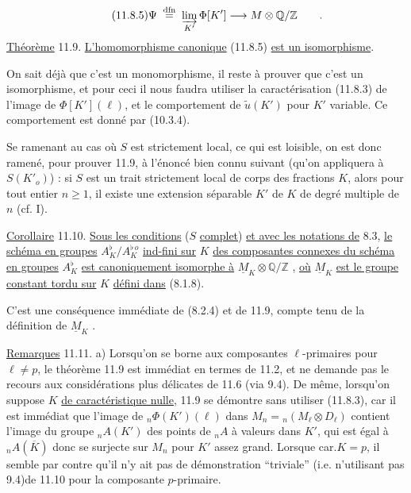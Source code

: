\begin{equation}\tag{11.8.5}
\Psi \;\overset{\mathrm{dfn}}{=}\; \varinjlim_{K'} \Phi[K'] \longrightarrow M \otimes \mathbb{Q}/\mathbb{Z} \qquad .
\end{equation}
\underline{Théorème} 11.9. \underline{L'homomorphisme canonique} (11.8.5) \underline{est un isomorphisme}.

On sait déjà que c'est un monomorphisme, il reste à prouver que c'est un isomorphisme, et pour ceci il nous faudra utiliser la caractérisation (11.8.3) de l'image de $\Phi[K'](\ell)$, et le comportement de $\widetilde{u}(K')$ pour $K'$ variable. Ce comportement est donné par (10.3.4).



Se ramenant au cas où $S$ est strictement local, ce qui est loisible, on est donc ramené, pour prouver 11.9, à l'énoncé bien connu suivant (qu'on appliquera à $S(K'_o)$) : si $S$ est un trait strictement local de corps des fractions $K$, alors pour tout entier $n \geqslant 1$, il existe une extension séparable $K'$ de $K$ de degré multiple de $n$ (cf. I\hspace{3em}).

\underline{Corollaire} 11.10. \underline{Sous les conditions} ($S$ \underline{complet}) \underline{et avec les notations de} 8.3, \underline{le schéma en groupes} $A^{\flat}_K/A^{\flat\,o}_K$ \underline{ind-fini sur} $K$ \underline{des composantes connexes du schéma en groupes} $A^{\flat}_K$ \underline{est canoniquement isomorphe à} $\underline{M}_K \otimes \mathbb{Q}/\mathbb{Z}$ , \underline{où} $\underline{M}_K$ \underline{est le groupe constant tordu sur} $K$ \underline{défini dans} (8.1.8).

C'est une conséquence immédiate de (8.2.4) et de 11.9, compte tenu de la définition de $\underline{M}_K$ .

\underline{Remarques} 11.11.  a) Lorsqu'on se borne aux composantes $\ell$-primaires pour $\ell \neq p$, le théorème 11.9 est immédiat en termes de 11.2, et ne demande pas le recours aux considérations plus délicates de 11.6 (via 9.4). De même, lorsqu'on suppose $K$ \underline{de caractéristique nulle}, 11.9 se démontre sans utiliser (11.8.3), car il est immédiat que l'image de ${}_n\Phi(K')(\ell)$ dans $M_n = {}_n(M_\ell \otimes D_\ell)$ contient l'image du groupe ${}_nA(K')$ des points de ${}_nA$ à valeurs dans $K'$, qui est égal à ${}_nA(\overline{K})$ donc se surjecte sur $M_n$ pour $K'$ assez grand. Lorsque car.$K = p$, il semble par contre qu'il n'y ait pas de démonstration ``triviale'' (i.e. n'utilisant pas 9.4)de 11.10 pour la composante $p$-primaire.

